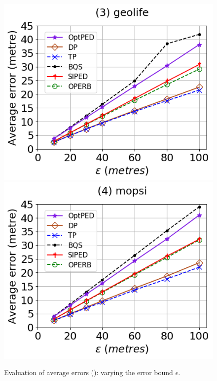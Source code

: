 \begin{figure}[tb!]
	\includegraphics[scale=0.315]{Figures/Exp-PED-error-epsilon-geolife.png}	\hspace{1ex}
	\includegraphics[scale=0.315]{Figures/Exp-PED-error-epsilon-mopsi.png}	
	\vspace{-2.5ex}
	\caption{\small Evaluation of average errors (\ped): varying the error bound $\epsilon$.}
	\label{fig:ae-ped-epsilon}
	\vspace{-2ex}
\end{figure}

